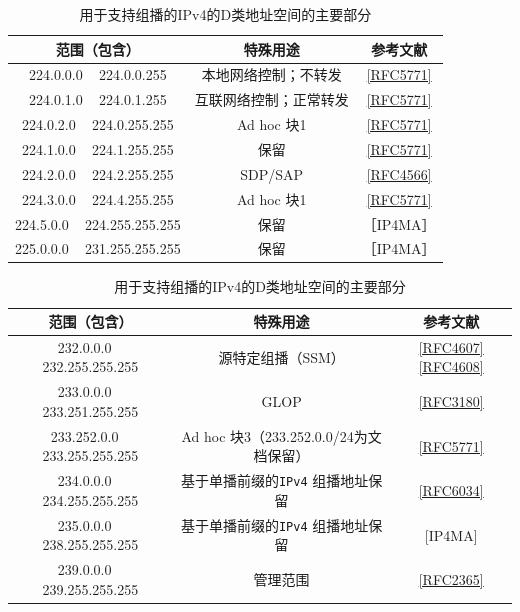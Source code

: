 \begin{table}[]
    \centering
    \caption{用于支持组播的IPv4的D类地址空间的主要部分}
    \begin{tabular}{c|c|c}
        \hline
        范围（包含）	              &	特殊用途	            &	参考文献  \\ \hline
        224.0.0.0 ~ 224.0.0.255	    &	本地网络控制；不转发	&	\href{https://www.rfc-editor.org/rfc/rfc5771}{[RFC5771]}  \\ \hline
        224.0.1.0 ~ 224.0.1.255	    &	互联网络控制；正常转发	&	\href{https://www.rfc-editor.org/rfc/rfc5771}{[RFC5771]}  \\ \hline
        224.0.2.0 ~ 224.0.255.255	&	Ad hoc 块1	        &	\href{https://www.rfc-editor.org/rfc/rfc5771}{[RFC5771]}  \\ \hline
        224.1.0.0 ~ 224.1.255.255	&	保留	            &	\href{https://www.rfc-editor.org/rfc/rfc5771}{[RFC5771]}  \\ \hline
        224.2.0.0 ~ 224.2.255.255	&	SDP/SAP	           &	\href{https://www.rfc-editor.org/rfc/rfc4566}{[RFC4566]}  \\ \hline
        224.3.0.0 ~ 224.4.255.255	&	Ad hoc 块1	        &	\href{https://www.rfc-editor.org/rfc/rfc5771}{[RFC5771]}  \\ \hline
        224.5.0.0 ~ 224.255.255.255	&	保留	            &	［IP4MA］  \\ \hline
        225.0.0.0 ~ 231.255.255.255	&	保留	            &	［IP4MA］  \\ \hline
    \end{tabular}
\end{table}

\begin{table}[]
    \centering
    \caption{用于支持组播的IPv4的D类地址空间的主要部分}
    \begin{tabular}{c|c|c}
        \hline
        范围（包含）	              &	特殊用途	            &	参考文献  \\ \hline
        232.0.0.0 ~ 232.255.255.255	    &	源特定组播（SSM）	&	\href{https://www.rfc-editor.org/rfc/rfc4607}{[RFC4607]}\href{https://www.rfc-editor.org/rfc/rfc4608}{[RFC4608]}  \\ \hline
        233.0.0.0 ~ 233.251.255.255	    &	GLOP	&	\href{https://www.rfc-editor.org/rfc/rfc3180}{[RFC3180]}  \\ \hline
        233.252.0.0 ~ 233.255.255.255	&	Ad hoc 块3（233.252.0.0/24为文档保留）  &	\href{https://www.rfc-editor.org/rfc/rfc5771}{[RFC5771]}  \\ \hline
        234.0.0.0 ~ 234.255.255.255	    &	基于单播前缀的\verb|IPv4| 组播地址保留  &	\href{https://www.rfc-editor.org/rfc/rfc6034}{[RFC6034]}  \\ \hline
        235.0.0.0 ~ 238.255.255.255	    &	基于单播前缀的\verb|IPv4| 组播地址保留  &	[IP4MA]  \\ \hline
        239.0.0.0 ~ 239.255.255.255	    &	管理范围    &	\href{https://www.rfc-editor.org/rfc/rfc2365}{[RFC2365]}  \\ \hline
    \end{tabular}
\end{table}

